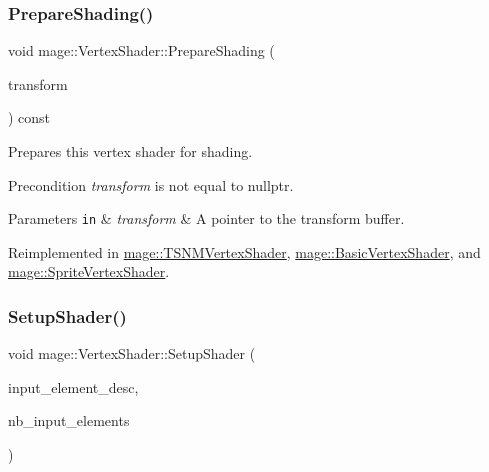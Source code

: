 \subsubsection{\texorpdfstring{Prepare\+Shading()}{PrepareShading()}}
{\footnotesize\ttfamily void mage\+::\+Vertex\+Shader\+::\+Prepare\+Shading (\begin{DoxyParamCaption}\item[{I\+D3\+D11\+Buffer $\ast$}]{transform }\end{DoxyParamCaption}) const\hspace{0.3cm}{\ttfamily [virtual]}}

Prepares this vertex shader for shading.

\begin{DoxyPrecond}{Precondition}
{\itshape transform} is not equal to {\ttfamily nullptr}. 
\end{DoxyPrecond}

\begin{DoxyParams}[1]{Parameters}
\mbox{\tt in}  & {\em transform} & A pointer to the transform buffer. \\
\hline
\end{DoxyParams}


Reimplemented in \hyperlink{classmage_1_1_t_s_n_m_vertex_shader_ad9ee77f591466d7843bcd413e3d7093d}{mage\+::\+T\+S\+N\+M\+Vertex\+Shader}, \hyperlink{classmage_1_1_basic_vertex_shader_ae565cb19b96591d5d1ff36ac0ff7344c}{mage\+::\+Basic\+Vertex\+Shader}, and \hyperlink{classmage_1_1_sprite_vertex_shader_a10be47ca65f4baed735b5ffb52ee92bf}{mage\+::\+Sprite\+Vertex\+Shader}.

\hypertarget{classmage_1_1_vertex_shader_a3de0e623c3c4d81b580386fc13f85323}{}\label{classmage_1_1_vertex_shader_a3de0e623c3c4d81b580386fc13f85323} 
\subsubsection{\texorpdfstring{Setup\+Shader()}{SetupShader()}\hspace{0.1cm}{\footnotesize\ttfamily [1/2]}}
{\footnotesize\ttfamily void mage\+::\+Vertex\+Shader\+::\+Setup\+Shader (\begin{DoxyParamCaption}\item[{const D3\+D11\+\_\+\+I\+N\+P\+U\+T\+\_\+\+E\+L\+E\+M\+E\+N\+T\+\_\+\+D\+E\+SC $\ast$}]{input\+\_\+element\+\_\+desc,  }\item[{uint32\+\_\+t}]{nb\+\_\+input\+\_\+elements }\end{DoxyParamCaption})\hspace{0.3cm}{\ttfamily [private]}}

